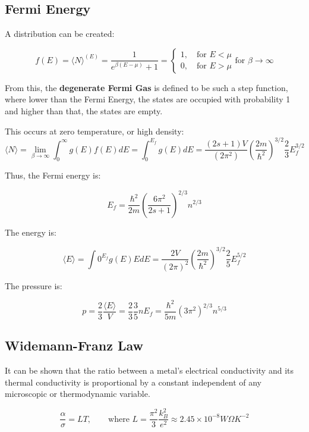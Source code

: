 \documentclass[12pt]{article}
\begin{document}
\subsection{Fermi Energy}

A distribution can be created:

\[\boxed{f(E) = \langle N \rangle ^{(E)} = \frac{1}{e^{\beta(E-\mu)} + 1} = \left.
\begin{cases}
1, \quad \text{for } E < \mu\\
0, \quad \text{for } E > \mu
\end{cases}
\right.
\text{for } \beta \to \infty
}\]

From this, the \textbf{degenerate Fermi Gas} is defined to be such a step function, where lower than the Fermi Energy, the states are occupied with probability 1 and higher than that, the states are empty. 

This occurs at zero temperature, or high density:
\[
\boxed{
\langle N \rangle = \lim_{\beta\to \infty}\int^\infty_0 g(E)f(E)dE = \int^{E_f}_0g(E)dE = \frac{(2s+1)V}{(2\pi^2)}\left(\frac{2m}{\hbar^2}\right)^{3/2}\frac23E_f^{3/2}
}\]

Thus, the Fermi energy is:

\[\boxed{E_f = \frac{\hbar^2}{2m}\left(\frac{6\pi^2}{2s+1}\right)^{2/3}n^{2/3}}\]

The energy is:

\[\boxed{
\langle E \rangle = \int0^{E_f}g(E)EdE = \frac{2V}{(2\pi)^2}\left(\frac{2m}{\hbar^2}\right)^{3/2}\frac25E_f^{5/2}
}\]

The pressure is:

\[
\boxed{
p = \frac23 \frac{\langle E \rangle}{V} = \frac23 \frac35nE_f = \frac{\hbar^2}{5m}(3\pi^2)^{2/3}n^{5/3}
}
\]

\subsection{Widemann-Franz Law}

It can be shown that the ratio between a metal's electrical conductivity and its thermal conductivity is proportional by a constant independent of any microscopic or thermodynamic variable.

\[\boxed{\frac{\alpha}{\sigma}= LT, \qquad \text{where } L = \frac{\pi^2}{3}\frac{k_B^2}{e^2}\approx2.45\times 10^{-8}W\Omega K^{-2}}\]
\end{document}
